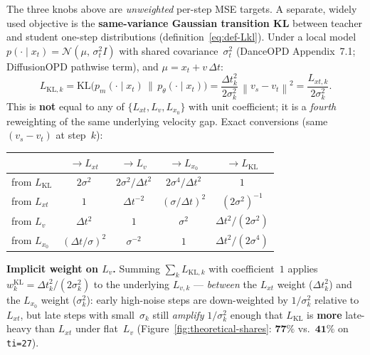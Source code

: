 \documentclass[11pt,a4paper]{article}
\newcommand{\norm}[1]{\left\lVert #1 \right\rVert}
\newcommand{\dt}{\Delta t}
\newcommand{\KL}{\mathrm{KL}}
\newcommand{\N}{\mathcal{N}}
\begin{document}
The three knobs above are \emph{unweighted} per-step MSE targets. A separate, widely used objective
is the \textbf{same-variance Gaussian transition KL} between teacher and student one-step
distributions (definition~\eqref{eq:def-Lkl}). Under a local model
$p(\cdot\mid x_t)=\N(\mu,\,\sigma_t^2 I)$ with shared covariance~$\sigma_t^2$ (DanceOPD
Appendix~7.1; DiffusionOPD pathwise term), and $\mu=x_t+v\,\dt$:
\begin{equation}
\boxed{
L_{\mathrm{KL},k}
=\KL\!\bigl(p_m(\cdot\mid x_t)\,\big\|\,p_\theta(\cdot\mid x_t)\bigr)
=\frac{\dt_k^2}{2\sigma_k^2}\,\norm{v_s-v_t}^2
=\frac{L_{xt,k}}{2\sigma_k^2}.
}
\label{eq:danceopd-kl}
\end{equation}
This is \textbf{not} equal to any of $\{L_{xt},L_v,L_{x_0}\}$ with unit coefficient; it is a
\emph{fourth} reweighting of the same underlying velocity gap. Exact conversions (same
$(v_s-v_t)$ at step~$k$):
\begin{center}
\footnotesize
\renewcommand{\arraystretch}{1.3}
\begin{tabular}{@{}l|cccc@{}}
 & $\to L_{xt}$ & $\to L_v$ & $\to L_{x_0}$ & $\to L_{\mathrm{KL}}$ \\
\midrule
from $L_{\mathrm{KL}}$ & $2\sigma^2$ & $2\sigma^2/\dt^2$ & $2\sigma^4/\dt^2$ & $1$ \\
from $L_{xt}$ & $1$ & $\dt^{-2}$ & $(\sigma/\dt)^2$ & $(2\sigma^2)^{-1}$ \\
from $L_v$ & $\dt^2$ & $1$ & $\sigma^2$ & $\dt^2/(2\sigma^2)$ \\
from $L_{x_0}$ & $(\dt/\sigma)^2$ & $\sigma^{-2}$ & $1$ & $\dt^2/(2\sigma^4)$ \\
\end{tabular}
\end{center}
\textbf{Implicit weight on $L_v$.} Summing $\sum_k L_{\mathrm{KL},k}$ with coefficient~$1$ applies
$w_k^{\mathrm{KL}}=\dt_k^2/(2\sigma_k^2)$ to the underlying $L_{v,k}$ --- \emph{between} the
$L_{xt}$ weight ($\dt_k^2$) and the $L_{x_0}$ weight ($\sigma_k^2$): early high-noise steps are
down-weighted by $1/\sigma_k^2$ relative to $L_{xt}$, but late steps with small~$\sigma_k$ still
\emph{amplify} $1/\sigma_k^2$ enough that $L_{\mathrm{KL}}$ is \textbf{more} late-heavy than
$L_{xt}$ under flat~$L_v$ (Figure~\ref{fig:theoretical-shares}: $\mathbf{77\%}$ vs.\ $\mathbf{41\%}$
on \texttt{ti=27}).
\end{document}
